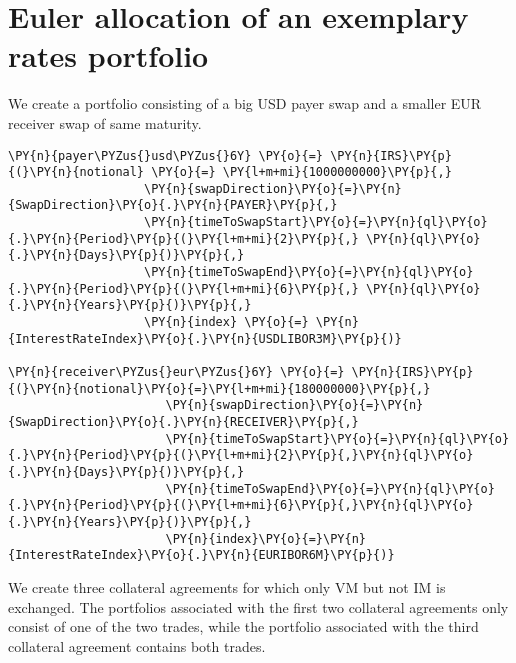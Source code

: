     

    
    \hypertarget{euler-allocation-of-an-exemplary-rates-portfolio}{%
\section{Euler allocation of an exemplary rates
portfolio}\label{euler-allocation-of-an-exemplary-rates-portfolio}}

    We create a portfolio consisting of a big USD payer swap and a smaller
EUR receiver swap of same maturity.

    \begin{tcolorbox}[breakable, size=fbox, boxrule=1pt, pad at break*=1mm,colback=cellbackground, colframe=cellborder]
\begin{Verbatim}[commandchars=\\\{\}]
\PY{n}{payer\PYZus{}usd\PYZus{}6Y} \PY{o}{=} \PY{n}{IRS}\PY{p}{(}\PY{n}{notional} \PY{o}{=} \PY{l+m+mi}{1000000000}\PY{p}{,}
                   \PY{n}{swapDirection}\PY{o}{=}\PY{n}{SwapDirection}\PY{o}{.}\PY{n}{PAYER}\PY{p}{,}
                   \PY{n}{timeToSwapStart}\PY{o}{=}\PY{n}{ql}\PY{o}{.}\PY{n}{Period}\PY{p}{(}\PY{l+m+mi}{2}\PY{p}{,} \PY{n}{ql}\PY{o}{.}\PY{n}{Days}\PY{p}{)}\PY{p}{,}
                   \PY{n}{timeToSwapEnd}\PY{o}{=}\PY{n}{ql}\PY{o}{.}\PY{n}{Period}\PY{p}{(}\PY{l+m+mi}{6}\PY{p}{,} \PY{n}{ql}\PY{o}{.}\PY{n}{Years}\PY{p}{)}\PY{p}{,}
                   \PY{n}{index} \PY{o}{=} \PY{n}{InterestRateIndex}\PY{o}{.}\PY{n}{USDLIBOR3M}\PY{p}{)}

\PY{n}{receiver\PYZus{}eur\PYZus{}6Y} \PY{o}{=} \PY{n}{IRS}\PY{p}{(}\PY{n}{notional}\PY{o}{=}\PY{l+m+mi}{180000000}\PY{p}{,}
                      \PY{n}{swapDirection}\PY{o}{=}\PY{n}{SwapDirection}\PY{o}{.}\PY{n}{RECEIVER}\PY{p}{,}
                      \PY{n}{timeToSwapStart}\PY{o}{=}\PY{n}{ql}\PY{o}{.}\PY{n}{Period}\PY{p}{(}\PY{l+m+mi}{2}\PY{p}{,}\PY{n}{ql}\PY{o}{.}\PY{n}{Days}\PY{p}{)}\PY{p}{,}
                      \PY{n}{timeToSwapEnd}\PY{o}{=}\PY{n}{ql}\PY{o}{.}\PY{n}{Period}\PY{p}{(}\PY{l+m+mi}{6}\PY{p}{,}\PY{n}{ql}\PY{o}{.}\PY{n}{Years}\PY{p}{)}\PY{p}{,}
                      \PY{n}{index}\PY{o}{=}\PY{n}{InterestRateIndex}\PY{o}{.}\PY{n}{EURIBOR6M}\PY{p}{)}
\end{Verbatim}
\end{tcolorbox}

    We create three collateral agreements for which only VM but not IM is
exchanged. The portfolios associated with the first two collateral
agreements only consist of one of the two trades, while the portfolio
associated with the third collateral agreement contains both trades.

